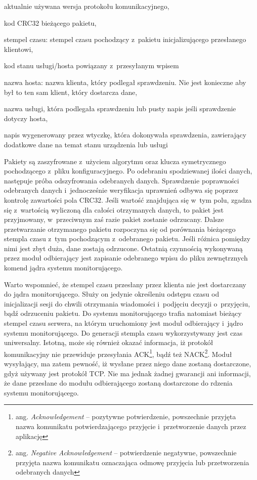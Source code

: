 \begin{description}
\item[wersja protokołu] aktualnie używana wersja protokołu komunikacyjnego,
\item[kod CRC32] kod CRC32 bieżącego pakietu,
\item stempel czasu: stempel czasu pochodzący z~pakietu
  inicjalizującego przesłanego klientowi,
\item[kod statusu] kod stanu usługi/hosta powiązany z~przesyłanym wpisem
\item nazwa hosta: nazwa klienta, który podlegał sprawdzeniu. Nie jest
  konieczne aby był to ten sam klient, który dostarcza dane,
\item[opis usługi] nazwa usługi, która podlegała sprawdzeniu lub pusty
  napis jeśli sprawdzenie dotyczy hosta,
\item[wynik sprawdzenia] napis wygenerowany przez wtyczkę, która
  dokonywała sprawdzenia, zawierający dodatkowe dane na temat stanu
  urządzenia lub usługi
\end{description}

Pakiety są zaszyfrowane z~użyciem algorytmu oraz klucza symetrycznego
pochodzącego z~pliku konfiguracyjnego. Po odebraniu spodziewanej
ilości danych, następuje próba odszyfrowania odebranych
danych. Sprawdzenie poprawności odebranych danych i~jednocześnie
weryfikacja uprawnień odbywa się poprzez kontrolę zawartości pola
CRC32. Jeśli wartość znajdująca się w~tym polu, zgadza się z~wartością
wyliczoną dla całości otrzymanych danych, to pakiet jest przyjmowany,
w~przeciwnym zaś razie pakiet zostanie odrzucany. Dalsze przetwarzanie
otrzymanego pakietu rozpoczyna się od porównania bieżącego stempla
czasu z~tym pochodzącym z~odebranego pakietu. Jeśli różnica pomiędzy
nimi jest zbyt duża, dane zostają odrzucone. Ostatnią czynnością
wykonywaną przez moduł odbierający jest zapisanie odebranego wpisu do
pliku zewnętrznych komend jądra systemu monitorującego.

Warto wspomnieć, że stempel czasu przesłany przez klienta nie jest
dostarczany do jądra monitorującego. Służy on jedynie określeniu
odstępu czasu od inicjalizacji sesji do chwili otrzymania wiadomości
i~podjęciu decyzji o~przyjęciu, bądź odrzuceniu pakietu. Do systemu
monitorującego trafia natomiast bieżący stempel czasu serwera, na
którym uruchomiony jest moduł odbierający i~jądro systemu
monitorującego. Do generacji stempla czasu wykorzystywany jest czas
uniwersalny. Istotną, może się również okazać informacja, iż protokół
komunikacyjny nie przewiduje przesyłania ACK\footnote {ang. {\em
    Acknowledgement} -- pozytywne potwierdzenie, powszechnie przyjęta
  nazwa komunikatu potwierdzającego przyjęcie i~przetworzenie danych
  przez aplikację}, bądź też NACK\footnote{ang. {\em Negative
    Acknowledgement} -- potwierdzenie negatywne, powszechnie przyjęta
  nazwa komunikatu oznaczająca odmowę przyjęcia lub przetworzenia
  odebranych danych}. Moduł wysyłający, ma zatem pewność, iż wysłane
przez niego dane zostaną dostarczone, gdyż używany jest protokół TCP.
Nie ma jednak żadnej gwarancji ani informacji, że dane przesłane do
modułu odbierającego zostaną dostarczone do rdzenia systemu
monitorującego.

